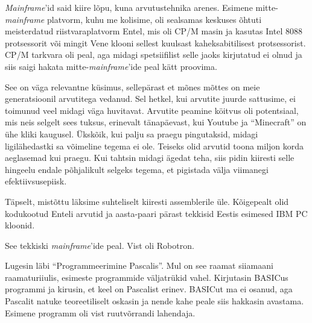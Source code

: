 \emph{Mainframe}'id said kiire lõpu, kuna arvutustehnika arenes. 
Esimene mitte-\emph{mainframe} platvorm, kuhu me kolisime, oli sealsamas 
keskuses õhtuti meisterdatud riistvaraplatvorm 
Entel, mis oli CP/M masin ja kasutas 
Intel 8088 protsessorit või mingit Vene klooni sellest kuulsast 
kaheksabitilisest protsessorist. CP/M tarkvara oli peal, aga midagi 
spetsiifilist selle jaoks kirjutatud ei olnud ja siis saigi 
hakata mitte-\emph{mainframe}'ide peal kätt proovima. 


See on väga relevantne küsimus, sellepärast et mõnes mõttes on meie 
generatsioonil arvutitega vedanud. Sel hetkel, kui arvutite juurde 
sattusime, ei toimunud veel midagi väga huvitavat. 
Arvutite peamine köitvus oli potentsiaal, mis neis selgelt sees tuksus, erinevalt tänapäevast,
kui Youtube ja \enquote{Minecraft} on ühe kliki kaugusel. Ükskõik, kui palju sa praegu
pingutaksid, midagi ligilähedastki sa võimeline tegema ei ole. Teiseks olid
arvutid toona miljon korda aeglasemad kui praegu. 
Kui tahtsin midagi ägedat teha, siis pidin kiiresti selle 
hingeelu endale põhjalikult selgeks tegema, et pigistada välja viimanegi 
efektiivsusepiisk.


Täpselt, mistõttu läksime suhteliselt kiiresti 
assemblerile üle. Kõigepealt olid kodukootud 
Enteli arvutid ja aasta-paari pärast tekkisid Eestis esimesed IBM PC 
kloonid. 


See tekkiski \emph{mainframe}'ide peal. Vist oli Robotron.


Lugesin läbi \enquote{Programmeerimine 
Pascalis}. 
Mul on see raamat siiamaani raamaturiiulis, esimeste programmide 
väljatrükid vahel. Kirjutasin 
BASICus programmi ja kirusin, et keel on Pascalist erinev. BASICut ma ei osanud, aga Pascalit natuke teoreetiliselt oskasin ja 
nende kahe peale siis hakkasin avastama. Esimene programm oli vist ruutvõrrandi 
lahendaja.


